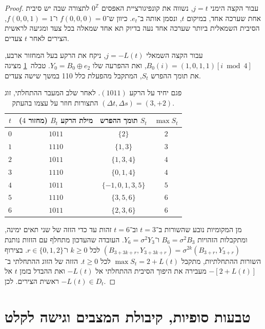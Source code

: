 \documentclass[11pt,a4paper]{article}
\begin{document}
\begin{proof}
עבור הקצה הימני $j = t$, נשווה את קונפיגורציית האפסים $0^{\mathbb{Z}}$ לתצורה שבה יש סיבית אחת שערכה אחד, במיקום $t$, ונסמן אותה ב־$e_t$. כיוון ש־$f(0, 0, 0) = 0$ ו־$f(0, 0, 1) = 1$, הסיבית השמאלית ביותר שערכה אחד נעה בדיוק תא אחד שמאלה בכל צעד ומגיעה לראשית הצירים לאחר $t$ צעדים.

עבור הקצה השמאלי $j = -L(t)$, ניקח את הרקע בעל המחזור ארבע, $B_0(i) = (1, 0, 1, 1)[i \bmod 4]$, ואת ההפרעה שלו $Y_0 = B_0 \oplus e_2$. טבלה~\ref{tab:period4_defect} מציגה את תומך ההפרש $S_t$, המתקבל מהפעלת כלל 110 במשך שישה צעדים.

\begin{table}[h]
\centering
\caption{פגם יחיד על הרקע $(1011)$. לאחר שלב המעבר ההתחלתי, זוג התצורות חוזר על עצמו בהעתק $(\Delta t, \Delta s) = (3, +2)$.}
\label{tab:period4_defect}
\begin{tabular}{cccc}
\toprule
$t$ & מילת הרקע $B_t$ (מחזור $4$) & תומך ההפרש $S_t$ & $\max S_t$ \\
\midrule
$0$ & $1011$ & $\{2\}$ & $2$ \\
$1$ & $1110$ & $\{1, 3\}$ & $3$ \\
$2$ & $1011$ & $\{1, 3, 4\}$ & $4$ \\
$3$ & $1110$ & $\{0, 1, 4\}$ & $4$ \\
$4$ & $1011$ & $\{-1, 0, 1, 3, 5\}$ & $5$ \\
$5$ & $1110$ & $\{3, 5, 6\}$ & $6$ \\
$6$ & $1011$ & $\{2, 3, 6\}$ & $6$ \\
\bottomrule
\end{tabular}
\end{table}

מן המקומיות נובע שהשורות ב־$t=3$ וב־$t=6$ זהות עד כדי הזזה של שני תאים ימינה, ומתקבלות הזהויות $B_6 = \sigma^2 B_3$ ו־$Y_6 = \sigma^2 Y_3$. העובדה שהעדכון מתחלף עם הזזות נותנת $(B_{3+3k+r}, Y_{3+3k+r}) = \sigma^{2k}(B_{3+r}, Y_{3+r})$ לכל $k \ge 0$ ו־$r \in \{0, 1, 2\}$. בצירוף השורות ההתחלתיות, מתקבל $\max S_t = 2 + L(t)$ לכל $t \ge 0$. הזזה של הזוג ההתחלתי ב־$-[2 + L(t)]$ מעבירה את היפוך הסיבית ההתחלתי אל $-L(t)$ ואת ההבדל בזמן $t$ אל ראשית הצירים. לכן $-L(t) \in D_t$.
\end{proof}
\section{טבעות סופיות, קיבולת המצבים וגישה לקלט}
\end{document}
